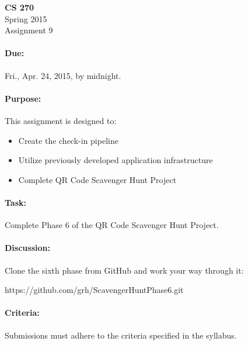 \documentclass[11pt]{article}
\begin{document}
    \begin{center}

        \large\textbf{CS 270} \\
        Spring 2015 \\
        Assignment 9 \\

    \end{center}

    \paragraph{Due:} Fri., Apr. 24, 2015, by midnight.

    \paragraph{Purpose:} This assignment is designed to:

        \begin{itemize}

            \item Create the check-in pipeline

            \item Utilize previously developed application
                infrastructure

            \item Complete QR Code Scavenger Hunt Project

        \end{itemize}

    \paragraph{Task:} Complete Phase 6 of the QR Code Scavenger Hunt
    Project.
    
    \paragraph{Discussion:} Clone the sixth phase from
    GitHub and work your way through it:

    \begin{center}

        https://github.com/grh/ScavengerHuntPhase6.git

    \end{center}

    \paragraph{Criteria:} Submissions must adhere to the criteria
    specified in the syllabus.
\end{document}
